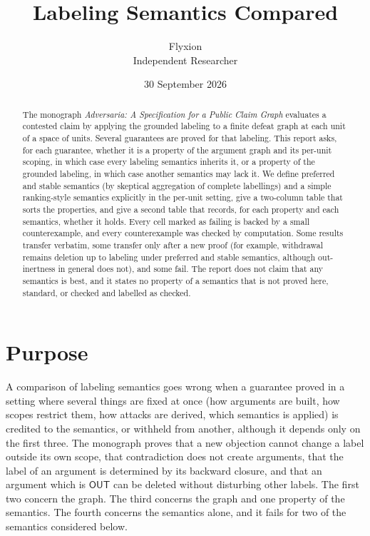 \documentclass[11pt]{article}
\title{Labeling Semantics Compared}
\author{Flyxion\\\small Independent Researcher}
\date{30 September 2026}
\theoremstyle{plain}
\theoremstyle{definition}
\theoremstyle{remark}
\newcommand{\OUT}{\textsf{OUT}}
\begin{document}
\maketitle

\begin{abstract}
\noindent
The monograph \emph{Adversaria: A Specification for a Public Claim Graph} evaluates a contested claim by applying the grounded labeling to a finite defeat graph at each unit of a space of units. Several guarantees are proved for that labeling. This report asks, for each guarantee, whether it is a property of the argument graph and its per-unit scoping, in which case every labeling semantics inherits it, or a property of the grounded labeling, in which case another semantics may lack it. We define preferred and stable semantics (by skeptical aggregation of complete labellings) and a simple ranking-style semantics explicitly in the per-unit setting, give a two-column table that sorts the properties, and give a second table that records, for each property and each semantics, whether it holds. Every cell marked as failing is backed by a small counterexample, and every counterexample was checked by computation. Some results transfer verbatim, some transfer only after a new proof (for example, withdrawal remains deletion up to labeling under preferred and stable semantics, although out-inertness in general does not), and some fail. The report does not claim that any semantics is best, and it states no property of a semantics that is not proved here, standard, or checked and labelled as checked.
\end{abstract}

\section{Purpose}

A comparison of labeling semantics goes wrong when a guarantee proved in a setting where several things are fixed at once (how arguments are built, how scopes restrict them, how attacks are derived, which semantics is applied) is credited to the semantics, or withheld from another, although it depends only on the first three. The monograph proves that a new objection cannot change a label outside its own scope, that contradiction does not create arguments, that the label of an argument is determined by its backward closure, and that an argument which is $\OUT$ can be deleted without disturbing other labels. The first two concern the graph. The third concerns the graph and one property of the semantics. The fourth concerns the semantics alone, and it fails for two of the semantics considered below.
\end{document}
